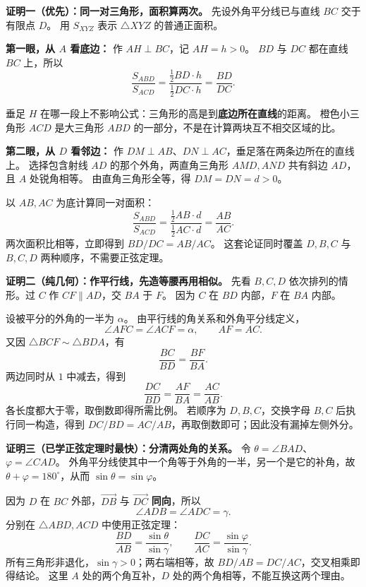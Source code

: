 \clearpage
\begin{proofbox}
\textbf{证明一（优先）：同一对三角形，面积算两次。}
先设外角平分线已与直线 $BC$ 交于有限点 $D$。
用 $S_{XYZ}$ 表示 $\triangle XYZ$ 的普通正面积。

\textbf{第一眼，从 $A$ 看底边：} 作 $AH\perp BC$，记 $AH=h>0$。
$BD$ 与 $DC$ 都在直线 $BC$ 上，所以
\[
 \frac{S_{ABD}}{S_{ACD}}
 =\frac{\tfrac12 BD\cdot h}{\tfrac12 DC\cdot h}
 =\frac{BD}{DC}.
\]

垂足 $H$ 在哪一段上不影响公式：三角形的高是到\textbf{底边所在直线}的距离。
橙色小三角形 $ACD$ 是大三角形 $ABD$ 的一部分，不是在计算两块互不相交区域的比。

\tcbbreak
\textbf{第二眼，从 $D$ 看邻边：} 作 $DM\perp AB$、$DN\perp AC$，垂足落在两条边所在的直线上。
选择包含射线 $AD$ 的那个外角，两直角三角形 $AMD,AND$ 共有斜边 $AD$，且 $A$ 处锐角相等。
由直角三角形全等，得 $DM=DN=d>0$。

以 $AB,AC$ 为底计算同一对面积：
\[
 \frac{S_{ABD}}{S_{ACD}}
 =\frac{\tfrac12 AB\cdot d}{\tfrac12 AC\cdot d}
 =\frac{AB}{AC}.
\]
两次面积比相等，立即得到 $\boxed{BD/DC=AB/AC}$。
这套论证同时覆盖 $D,B,C$ 与 $B,C,D$ 两种顺序，不需要正弦定理。

\tcbbreak
\textbf{证明二（纯几何）：作平行线，先造等腰再用相似。}
先看 $B,C,D$ 依次排列的情形。过 $C$ 作 $CF\parallel AD$，交 $BA$ 于 $F$。
因为 $C$ 在 $BD$ 内部，$F$ 在 $BA$ 内部。

设被平分的外角的一半为 $\alpha$。
由平行线的角关系和外角平分线定义，
\[
 \angle AFC=\angle ACF=\alpha,
 \qquad AF=AC.
\]
又因 $\triangle BCF\sim\triangle BDA$，有
\[
 \frac{BC}{BD}=\frac{BF}{BA}.
\]
两边同时从 $1$ 中减去，得到
\[
 \frac{DC}{BD}=\frac{AF}{BA}
              =\frac{AC}{AB}.
\]
各长度都大于零，取倒数即得所需比例。
若顺序为 $D,B,C$，交换字母 $B,C$ 后执行同一构造，得到
$DC/BD=AC/AB$，再取倒数即可；因此没有漏掉左侧外分。

\tcbbreak
\textbf{证明三（已学正弦定理时最快）：分清两处角的关系。}
令 $\theta=\angle BAD$、$\varphi=\angle CAD$。
外角平分线使其中一个角等于外角的一半，另一个是它的补角，故
$\theta+\varphi=180^\circ$，从而 $\sin\theta=\sin\varphi$。

因为 $D$ 在 $BC$ 外部，$\overrightarrow{DB}$ 与 $\overrightarrow{DC}$ \textbf{同向}，所以
\[
 \angle ADB=\angle ADC=\gamma.
\]
分别在 $\triangle ABD,ACD$ 中使用正弦定理：
\[
 \frac{BD}{AB}=\frac{\sin\theta}{\sin\gamma},\qquad
 \frac{DC}{AC}=\frac{\sin\varphi}{\sin\gamma}.
\]
所有三角形非退化，$\sin\gamma>0$；两右端相等，故 $BD/AB=DC/AC$，交叉相乘即得结论。
这里 $A$ 处的两个角互补，$D$ 处的两个角相等，不能互换这两个理由。


\end{proofbox}
